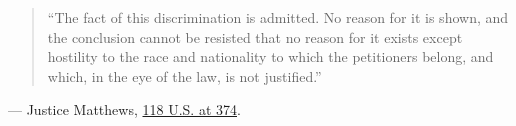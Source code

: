 \documentclass[12pt]{article}
\begin{document}
\begin{quote}
``The fact of this discrimination is admitted. No reason for it is shown, and the conclusion cannot be resisted that no reason for it exists except hostility to the race and nationality to which the petitioners belong, and which, in the eye of the law, is not justified.''
\end{quote}
\noindent --- Justice Matthews, \href{https://supreme.justia.com/cases/federal/us/118/356/}{118 U.S. at 374}.
\end{document}
